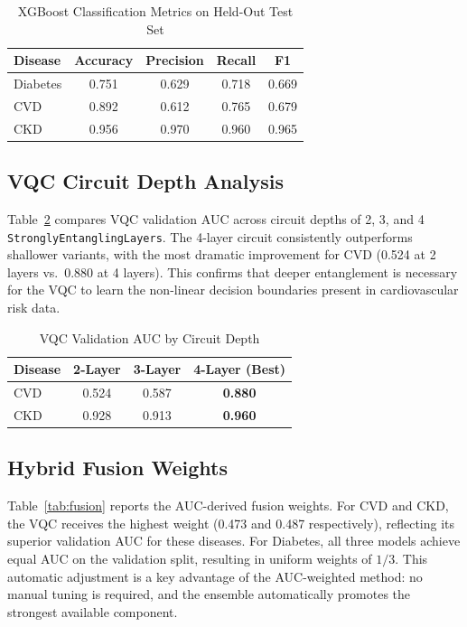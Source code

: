 ﻿\documentclass[conference]{IEEEtran}
\begin{document}
\begin{table}[htbp]
\caption{XGBoost Classification Metrics on Held-Out Test Set}
\label{tab:classification}
\centering
\begin{tabular}{lcccc}
\toprule
\textbf{Disease} & \textbf{Accuracy} & \textbf{Precision} & \textbf{Recall} & \textbf{F1} \\
\midrule
Diabetes & 0.751 & 0.629 & 0.718 & 0.669 \\
CVD      & 0.892 & 0.612 & 0.765 & 0.679 \\
CKD      & 0.956 & 0.970 & 0.960 & 0.965 \\
\bottomrule
\end{tabular}
\end{table}

\subsection{VQC Circuit Depth Analysis}

Table~\ref{tab:vqc_layers} compares VQC validation AUC across circuit depths of 2, 3,
and 4 \texttt{StronglyEntanglingLayers}. The 4-layer circuit consistently outperforms
shallower variants, with the most dramatic improvement for CVD (0.524 at 2 layers
vs.\ 0.880 at 4 layers). This confirms that deeper entanglement is necessary for the VQC
to learn the non-linear decision boundaries present in cardiovascular risk data.

\begin{table}[htbp]
\caption{VQC Validation AUC by Circuit Depth}
\label{tab:vqc_layers}
\centering
\begin{tabular}{lccc}
\toprule
\textbf{Disease} & \textbf{2-Layer} & \textbf{3-Layer} & \textbf{4-Layer (Best)} \\
\midrule
CVD & 0.524 & 0.587 & \textbf{0.880} \\
CKD & 0.928 & 0.913 & \textbf{0.960} \\
\bottomrule
\end{tabular}
\end{table}

\subsection{Hybrid Fusion Weights}

Table~\ref{tab:fusion} reports the AUC-derived fusion weights. For CVD and CKD, the VQC
receives the highest weight (0.473 and 0.487 respectively), reflecting its superior
validation AUC for these diseases. For Diabetes, all three models achieve equal AUC on
the validation split, resulting in uniform weights of $1/3$. This automatic adjustment
is a key advantage of the AUC-weighted method: no manual tuning is required, and the
ensemble automatically promotes the strongest available component.
\end{document}
